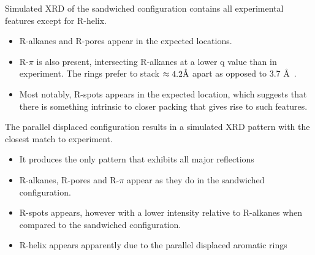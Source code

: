 \documentclass{article}
\newcommand{\angstrom}{\textup{\AA}}
\begin{document}
  

  Simulated XRD of the sandwiched configuration contains all experimental features
  except for R-helix.
  \begin{itemize}
        \item R-alkanes and R-pores appear in the expected locations.
        \item R-$\pi$ is also present, intersecting R-alkanes at a lower q value than
        in experiment. The rings prefer to stack $\approx 4.2 \angstrom$ apart as %
        opposed to 3.7 \angstrom~.
        \item Most notably, R-spots appears in the expected location, which suggests 
        that there is something intrinsic to closer packing that gives rise 
        to such features. 
  \end{itemize}

  The parallel displaced configuration results in a simulated XRD pattern with 
  the closest match to experiment. 
  \begin{itemize}
	\item It produces the only pattern that exhibits all major reflections
	\item R-alkanes, R-pores and R-$\pi$ appear as they do in the sandwiched configuration. 
	\item R-spots appears, however with a lower intensity relative to R-alkanes
        when compared to the sandwiched configuration.
        \item R-helix appears apparently due to the parallel displaced aromatic rings
  \end{itemize}
  
\end{document}
